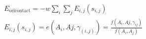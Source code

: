 \documentclass[paper=a5,fontsize=16pt]{scrbook}
\begin{document}
            \begin{preview}

            
        \begin{align*}        
            &E_{\text{oricontact}} = -w \sum_{i} \sum_{j} E_{i,j}(s_{i,j}) \\
            &E_{i,j}(s_{i,j}) = e(A_i,Aj, \gamma_(i,j) ) = \frac{ f(A_i,Aj,\gamma_{ij}) } { f(A_i, A_j)}
        \end{align*}        
        


            \end{preview}
            
\end{document}
